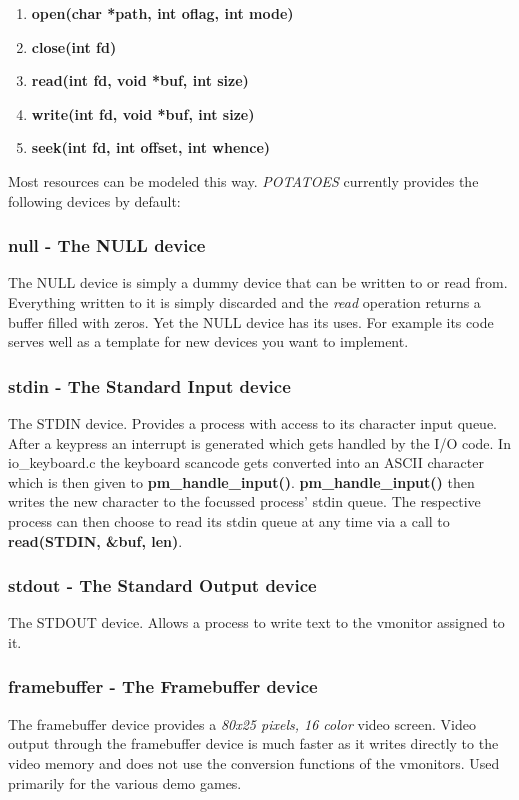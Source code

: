 \documentclass[11pt,a4paper]{scrartcl}
\begin{document}
\begin{enumerate}
\item{\textbf{open(char *path, int oflag, int mode)}}
\item{\textbf{close(int fd)}}
\item{\textbf{read(int fd, void *buf, int size)}}
\item{\textbf{write(int fd, void *buf, int size)}}
\item{\textbf{seek(int fd, int offset, int whence)}}
\end{enumerate}

Most resources can be modeled this way. \textit{POTATOES} currently provides the following devices by default:

\subsubsection{null - The NULL device}
The NULL device is simply a dummy device that can be written to or read from. Everything written to it is simply discarded and the \textit{read} operation returns a buffer filled with zeros.
Yet the NULL device has its uses. For example its code serves well as a template for new devices you want to implement.

\subsubsection{stdin - The Standard Input device}
The STDIN device. Provides a process with access to its character input queue. After a keypress an interrupt is generated which gets handled by the I/O code. In io\_keyboard.c the keyboard scancode gets converted into an ASCII character which is then given to \textbf{pm\_handle\_input()}. \textbf{pm\_handle\_input()} then writes the new character to the focussed process' stdin queue. The respective process can then choose to read its stdin queue at any time via a call to \textbf{read(STDIN, \&buf, len)}.

\subsubsection{stdout - The Standard Output device}
The STDOUT device. Allows a process to write text to the vmonitor assigned to it.

\subsubsection{framebuffer - The Framebuffer device}
The framebuffer device provides a \textit{80x25 pixels, 16 color} video screen. Video output through the framebuffer device is much faster as it writes directly to the video memory and does not use the conversion functions of the vmonitors. Used primarily for the various demo games.
\end{document}
